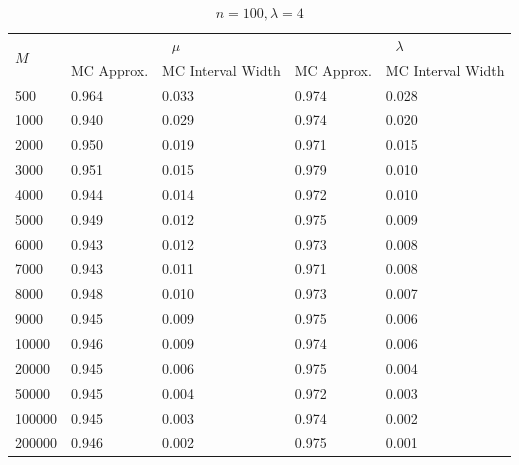 \documentclass{article}
\begin{document}
\begin{table}[!htb]
		\begin{subtable}[b]{\textwidth}
		\centering
		\begin{tabular}{l|ll|ll}
		\toprule
        \multirow{2}{*}{$M$} & \multicolumn{2}{c|}{$\mu$}      & \multicolumn{2}{c}{$\lambda$}  \\ 
                           & MC Approx. & MC Interval Width & MC Approx. & MC Interval Width \\
                           \midrule
        500    &0.964 &0.033 &0.974 &0.028\\
        1000   &0.940 &0.029 &0.974 &0.020\\
        2000   &0.950 &0.019 &0.971 &0.015\\
        3000   &0.951 &0.015 &0.979 &0.010\\
        4000   &0.944 &0.014 &0.972 &0.010\\
        5000   &0.949 &0.012 &0.975 &0.009\\
        6000   &0.943 &0.012 &0.973 &0.008\\
        7000   &0.943 &0.011 &0.971 &0.008\\
        8000   &0.948 &0.010 &0.973 &0.007\\
        9000   &0.945 &0.009 &0.975 &0.006\\
        10000  &0.946 &0.009 &0.974 &0.006\\
        20000  &0.945 &0.006 &0.975 &0.004\\
        50000  &0.945 &0.004 &0.972 &0.003\\
        100000 &0.945 &0.003 &0.974 &0.002\\
        200000 &0.946 &0.002 &0.975 &0.001\\
       \bottomrule
       \end{tabular}
       \caption{$n = 100, \lambda = 4$}
       \end{subtable}%

              \end{table}
       \clearpage
\end{document}
